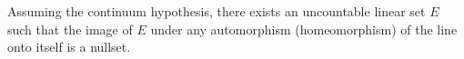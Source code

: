 Assuming the continuum hypothesis, there exists an uncountable linear set $E$ such that the image of $E$ under any automorphism (homeomorphism) of the line onto itself is a nullset.
